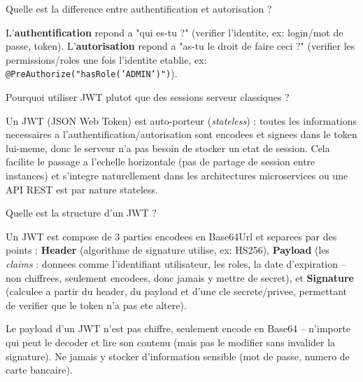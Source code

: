 \documentclass[11pt,a4paper]{article}
\begin{document}
\begin{question} Quelle est la difference entre authentification et autorisation ?
\end{question}
\begin{reponse}
L'\textbf{authentification} repond a "qui es-tu ?" (verifier l'identite, ex: login/mot de passe, token). L'\textbf{autorisation} repond a "as-tu le droit de faire ceci ?" (verifier les permissions/roles une fois l'identite etablie, ex: \texttt{@PreAuthorize("hasRole('ADMIN')")}).
\end{reponse}

\begin{question} Pourquoi utiliser JWT plutot que des sessions serveur classiques ?
\end{question}
\begin{reponse}
Un JWT (JSON Web Token) est auto-porteur (\emph{stateless}) : toutes les informations necessaires a l'authentification/autorisation sont encodees et signees dans le token lui-meme, donc le serveur n'a pas besoin de stocker un etat de session. Cela facilite le passage a l'echelle horizontale (pas de partage de session entre instances) et s'integre naturellement dans les architectures microservices ou une API REST est par nature stateless.
\end{reponse}

\begin{question} Quelle est la structure d'un JWT ?
\end{question}
\begin{reponse}
Un JWT est compose de 3 parties encodees en Base64Url et separees par des points : \textbf{Header} (algorithme de signature utilise, ex: HS256), \textbf{Payload} (les \emph{claims} : donnees comme l'identifiant utilisateur, les roles, la date d'expiration -- non chiffrees, seulement encodees, donc jamais y mettre de secret), et \textbf{Signature} (calculee a partir du header, du payload et d'une cle secrete/privee, permettant de verifier que le token n'a pas ete altere).
\end{reponse}

\begin{piege}
Le payload d'un JWT n'est pas chiffre, seulement encode en Base64 -- n'importe qui peut le decoder et lire son contenu (mais pas le modifier sans invalider la signature). Ne jamais y stocker d'information sensible (mot de passe, numero de carte bancaire).
\end{piege}

\newpage
\end{document}
